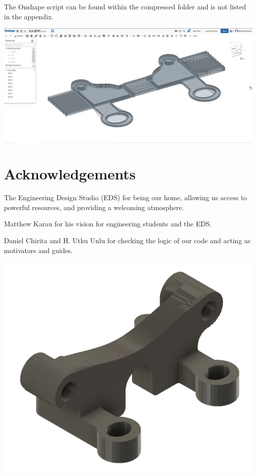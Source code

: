 \documentclass[11pt, A4paper]{article}
\begin{document}
\begin{multicols}{2}
The Onshape script can be found within the compressed folder and is not listed in the appendix. 

\begingroup
    \bigskip
    \centering
    \includegraphics[width=\columnwidth]{onshape_two}
    \small{}
    \label{fig:onshape_one}
        \bigskip
\endgroup

\section{Acknowledgements}
The Engineering Design Studio (EDS) for being our home, allowing us access to powerful resources, and providing a welcoming atmosphere.



Matthew Karau for his vision for engineering students and the EDS. 

Daniel Chirita and H. Utku Unlu for checking the logic of our code and acting as motivators and guides.

\printbibliography

\end{multicols}

\begingroup
    \bigskip
    \centering
    \includegraphics[scale = 0.3]{final}
    \small{}
    \label{fig:final}
        \bigskip
\endgroup
\end{document}
